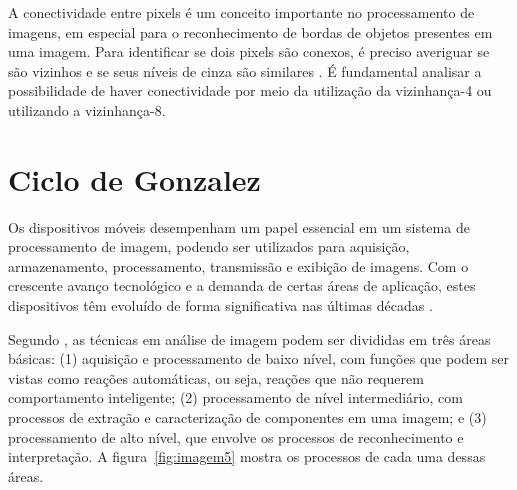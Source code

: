 A conectividade entre pixels é um conceito importante no processamento de imagens, em especial para o reconhecimento de bordas de objetos presentes em uma imagem. Para identificar se dois pixels são conexos, é preciso averiguar se são vizinhos e se seus níveis de cinza são similares . É fundamental analisar a possibilidade de haver conectividade por meio da utilização da vizinhança-4 ou utilizando a vizinhança-8.




\section{Ciclo de Gonzalez}
Os dispositivos móveis desempenham um papel essencial em um sistema de processamento de imagem, podendo ser utilizados para aquisição, armazenamento, processamento, transmissão e exibição de imagens. Com o crescente avanço tecnológico e a demanda de certas áreas de aplicação, estes dispositivos têm evoluído de forma significativa nas últimas décadas \cite{PEDRINI2008}.

Segundo , as técnicas em análise de imagem podem ser divididas em três áreas básicas: (1) aquisição e processamento de baixo nível, com funções que podem ser vistas como reações automáticas, ou seja, reações que não requerem comportamento inteligente; (2) processamento de nível intermediário, com processos de extração e caracterização de componentes em uma imagem; e (3) processamento de alto nível, que envolve os processos de reconhecimento e interpretação. A figura~\ref{fig:imagem5} mostra os processos de cada uma dessas áreas.


